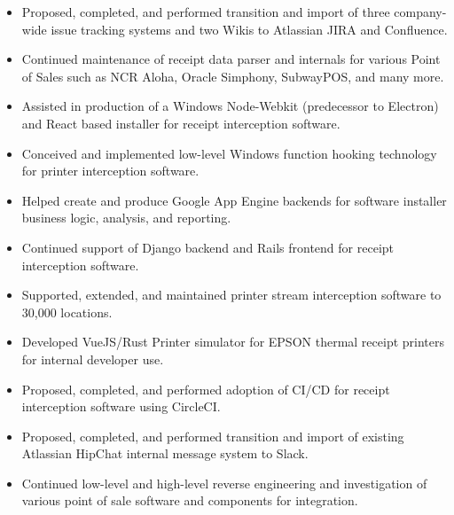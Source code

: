 \documentclass[10pt,letter,ragged2e]{altacv}
\begin{document}
\begin{paracol}{2}
\begin{itemize}
\item Proposed, completed, and performed transition and import of three company-wide issue tracking systems and two Wikis to Atlassian JIRA and Confluence.
\item Continued maintenance of receipt data parser and internals for various Point of Sales such as NCR Aloha, Oracle Simphony, SubwayPOS, and many more.
\item Assisted in production of a Windows Node-Webkit (predecessor to Electron) and React based installer for receipt interception software.
\item Conceived and implemented low-level Windows function hooking technology for printer interception software.
\item Helped create and produce Google App Engine backends for software installer business logic, analysis, and reporting.
\item Continued support of Django backend and Rails frontend for receipt interception software.
\item Supported, extended, and maintained printer stream interception software to 30,000 locations.
\item Developed VueJS/Rust Printer simulator for EPSON thermal receipt printers for internal developer use.
\item Proposed, completed, and performed adoption of CI/CD for receipt interception software using CircleCI.
\item Proposed, completed, and performed transition and import of existing Atlassian HipChat internal message system to Slack.
\item Continued low-level and high-level reverse engineering and investigation of various point of sale software and components for integration.
\end{itemize}

\divider


\end{paracol}
\end{document}
